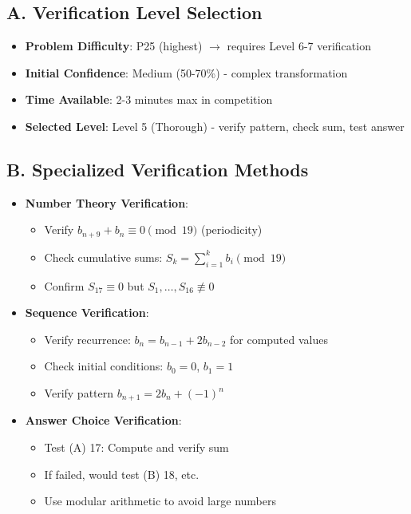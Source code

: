 \documentclass[11pt]{article}
\begin{document}
\begin{verificationbox}
\subsection*{A. Verification Level Selection}
\begin{itemize}[leftmargin=*]
    \item \textbf{Problem Difficulty}: P25 (highest) $\rightarrow$ requires Level 6-7 verification
    
    \item \textbf{Initial Confidence}: Medium (50-70\%) - complex transformation
    
    \item \textbf{Time Available}: 2-3 minutes max in competition
    
    \item \textbf{Selected Level}: Level 5 (Thorough) - verify pattern, check sum, test answer
\end{itemize}

\subsection*{B. Specialized Verification Methods}
\begin{itemize}[leftmargin=*]
    \item \textbf{Number Theory Verification}:
    \begin{itemize}
        \item Verify $b_{n+9} + b_n \equiv 0 \pmod{19}$ (periodicity)
        \item Check cumulative sums: $S_k = \sum_{i=1}^{k} b_i \pmod{19}$
        \item Confirm $S_{17} \equiv 0$ but $S_1, \ldots, S_{16} \not\equiv 0$
    \end{itemize}
    
    \item \textbf{Sequence Verification}:
    \begin{itemize}
        \item Verify recurrence: $b_n = b_{n-1} + 2b_{n-2}$ for computed values
        \item Check initial conditions: $b_0 = 0$, $b_1 = 1$
        \item Verify pattern $b_{n+1} = 2b_n + (-1)^n$
    \end{itemize}
    
    \item \textbf{Answer Choice Verification}:
    \begin{itemize}
        \item Test (A) 17: Compute and verify sum
        \item If failed, would test (B) 18, etc.
        \item Use modular arithmetic to avoid large numbers
    \end{itemize}
\end{itemize}


\end{verificationbox}
\end{document}
